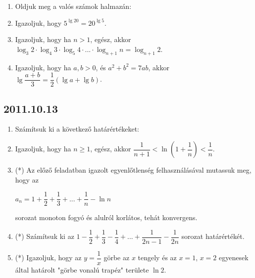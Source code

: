 \begin{enumerate}
		\item Oldjuk meg a valós számok halmazán:
		\item Igazoljuk, hogy $5^{\lg 20}=20^{\lg5}$.
        \item Igazoljuk, hogy ha $n>1$, egész, akkor $\log_{3}2\cdot \log_{4}3\cdot \log_{5}4\cdot ... \cdot \log_{n+1}n = \log_{n+1}2 $.
        \item Igazoljuk, hogy ha $a,b>0$, és $a^{2}+b^{2}=7ab$, akkor $\lg \dfrac{a+b}{3} = \dfrac{1}{2}(\lg a+\lg b)$.
\end{enumerate}


\subsection*{2011.10.13}

\begin{enumerate}
\item Számítsuk ki a következő határértékeket:
        \item Igazoljuk, hogy ha $n\ge1$, egész, akkor $\dfrac{1}{n+1} < \ln \left(1+\dfrac{1}{n}\right)<\dfrac{1}{n}$.
        \item (*)  Az előző feladatban igazolt egyenlőtlenség felhasználásával mutassuk meg, hogy az 
        \begin{center}$a_{n}=1+\dfrac{1}{2}+\dfrac{1}{3}+...+\dfrac{1}{n}-\ln n$ \end{center}
        sorozat monoton fogyó és alulról korlátos, tehát konvergens.
		\item (*) Számítsuk ki az $1-\dfrac{1}{2}+\dfrac{1}{3}-\dfrac{1}{4}+...+\dfrac{1}{2n-1}-\dfrac{1}{2n}$ sorozat határértékét.
        \item (*) Igazoljuk, hogy az $y = \dfrac{1}{x}$ görbe az $x$ tengely és az $x=1$, $x=2$ egyenesek által határolt "görbe vonalú trapéz" területe $\ln 2$.
\end{enumerate}


